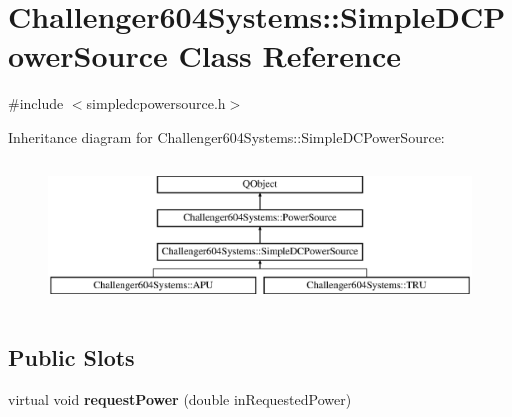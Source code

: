 \hypertarget{class_challenger604_systems_1_1_simple_d_c_power_source}{\section{Challenger604\-Systems\-:\-:Simple\-D\-C\-Power\-Source Class Reference}
\label{class_challenger604_systems_1_1_simple_d_c_power_source}
}


{\ttfamily \#include $<$simpledcpowersource.\-h$>$}

Inheritance diagram for Challenger604\-Systems\-:\-:Simple\-D\-C\-Power\-Source\-:\begin{figure}[H]
\begin{center}
\leavevmode
\includegraphics[height=3.902439cm]{class_challenger604_systems_1_1_simple_d_c_power_source}
\end{center}
\end{figure}
\subsection*{Public Slots}
\begin{DoxyCompactItemize}
\item 
\hypertarget{class_challenger604_systems_1_1_simple_d_c_power_source_a7af4e82286499ec04189398fa14b7b9f}{virtual void {\bfseries request\-Power} (double in\-Requested\-Power)}\label{class_challenger604_systems_1_1_simple_d_c_power_source_a7af4e82286499ec04189398fa14b7b9f}

\end{DoxyCompactItemize}

